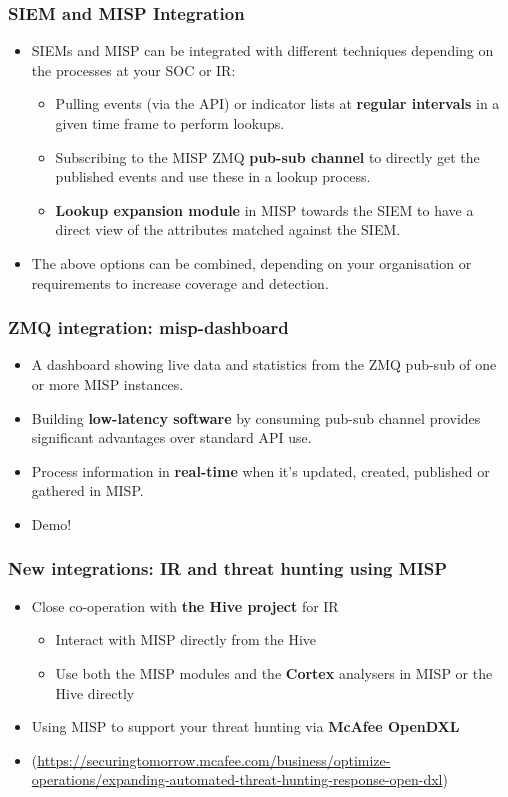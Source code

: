 \begin{frame}
\frametitle{SIEM and MISP Integration}
\begin{itemize}
        \item SIEMs and MISP can be integrated with different techniques depending on the processes at your SOC or IR:
        \begin{itemize}
                \item Pulling events (via the API) or indicator lists at {\bf regular intervals} in a given time frame to perform lookups.
                \item Subscribing to the MISP ZMQ {\bf pub-sub channel} to directly get the published events and use these in a lookup process.
                \item {\bf Lookup expansion module} in MISP towards the SIEM to have a direct view of the attributes matched against the SIEM.
        \end{itemize}
        \item The above options can be combined, depending on your organisation or requirements to increase coverage and detection.
\end{itemize}
\end{frame}

\begin{frame}
\frametitle{ZMQ integration: misp-dashboard}
        \begin{itemize}
        \item A dashboard showing live data and statistics from the ZMQ pub-sub of one or more MISP instances.
        \item Building {\bf low-latency software} by consuming pub-sub channel provides significant advantages over standard API use.
        \item Process information in {\bf real-time} when it's updated, created, published or gathered in MISP.
        \item Demo!
        \end{itemize}

\end{frame}

\begin{frame}
    \frametitle{New integrations: IR and threat hunting using MISP}
    \begin{itemize}
        \item Close co-operation with {\bf the Hive project} for IR
        \begin{itemize}
            \item Interact with MISP directly from the Hive
            \item Use both the MISP modules and the {\bf Cortex} analysers in MISP or the Hive directly
        \end{itemize}
        \item Using MISP to support your threat hunting via {\bf McAfee OpenDXL}
        \item (\url{https://securingtomorrow.mcafee.com/business/optimize-operations/expanding-automated-threat-hunting-response-open-dxl})
    \end{itemize}
\end{frame}

